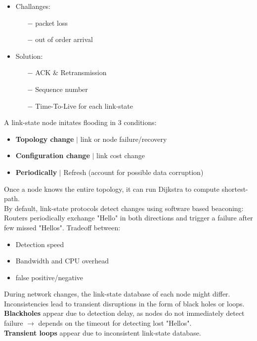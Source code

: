 \documentclass[a4paper, fontsize=8pt, landscape, DIV=1]{scrartcl}
\begin{document}
\begin{multicols*}{4}
		\begin{itemize}[noitemsep]
			\item Challanges: 
			\begin{itemize}
				\item[$-$] packet loss
				\item[$-$] out of order arrival
			\end{itemize}
			\item Solution:
			\begin{itemize}
				\item[$-$] ACK \& Retransmission
				\item[$-$] Sequence number
				\item[$-$] Time-To-Live for each link-state
			\end{itemize}
		\end{itemize}  
		A link-state node initates flooding in 3 conditions: 
		\begin{itemize}[noitemsep]
			\item \textbf{Topology change} $\vert$ link or node failure/recovery
			\item \textbf{Configuration change} $\vert$ link cost change
			\item \textbf{Periodically} $\vert$ Refresh (account for possible data
			corruption)
		\end{itemize}
		Once a node knows the entire topology, it can run Dijkstra to compute
		shortest-path.\\
		By default, link-state protocols detect changes using software based
		beaconing:\\
		Routers periodically exchange "Hello" in both directions and trigger a
		failure after few missed "Hellos". Tradeoff between: 
		\begin{itemize}[noitemsep]
			\item Detection speed
			\item Bandwidth and CPU overhead
			\item false positive/negative
		\end{itemize}  
		During network changes, the link-state database of each node might differ.
		Inconsistencies lead to transient disruptions in the form of black holes or
		loops.\\
		\textbf{Blackholes} appear due to detection delay, as nodes do not
		immediately detect failure $\rightarrow$ depends on the timeout for detecting
		lost "Hellos".\\
		\textbf{Transient loops} appear due to inconsistent link-state database.
		

\end{multicols*}
\end{document}
